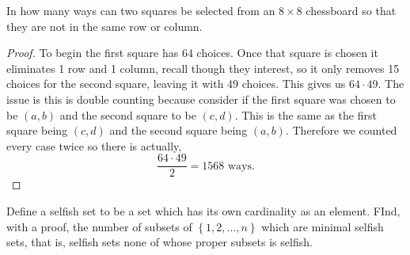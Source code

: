 \documentclass[11pt]{article}
\newenvironment{problem}[2][Problem\!]{\begin{trivlist}
\item[\hskip \labelsep {\bfseries #1}\hskip \labelsep {\bfseries #2}]}{\end{trivlist}}
\newcommand{\set}[1]{\left\{#1\right\}} %
\begin{document}
\begin{tcolorbox}
    \begin{problem} {IC | 11/05 | 110.}
        In how many ways can two squares be selected from an $8\times 8$ chessboard so that they are not in the same row or column.
    \end{problem}
\end{tcolorbox}
\begin{proof}
    To begin the first square has $64$ choices. Once that square is chosen it eliminates 1 row and 1 column, recall though they interest, so it only removes 15 choices for the second square, leaving it with 49 choices. This gives us $64 \cdot 49$. The issue is this is double counting because consider if the first square was chosen to be $(a,b)$ and the second square to be $(c,d)$. This is the same as the first square being $(c,d)$ and the second square being $(a,b)$. Therefore we counted every case twice so there is actually,
    \[\frac{64\cdot 49}{2} = 1568 \text{ ways.}\]
\end{proof}
\newpage
\begin{tcolorbox}
    \begin{problem}{ IC | 11/05 | 124. (Putnam)}
        Define a selfish set to be a set which has its own cardinality as an element. FInd, with a proof, the number of subsets of $\set{1,2,\dots, n}$ which are minimal selfish sets, that is, selfish sets none of whose proper subsets is selfish. 
    \end{problem}
\end{tcolorbox}
\end{document}

